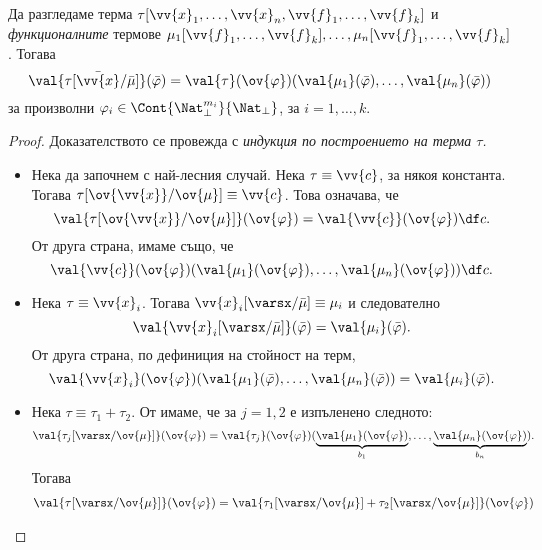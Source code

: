 \begin{framed}
  \begin{lemma}
    \label{lem:rec:substitution}
    Да разгледаме терма $\tau[\vv{x}_1,\dots,\vv{x}_n,\vv{f}_1,\dots,\vv{f}_{k}]$ и {\em функционалните} термове 
    $\mu_1[\vv{f}_1,\dots,\vv{f}_k],\dots, \mu_n[\vv{f}_1,\dots,\vv{f}_k]$.
    Тогава
    \[\val{\tau[\bar{\vv{x}}/\bar{\mu}]}(\bar{\varphi}) = \val{\tau}(\ov{\varphi})(\val{\mu_1}(\bar{\varphi}),\dots,\val{\mu_n}(\bar{\varphi}))\]
    за произволни $\varphi_i \in \Cont{\Nat^{m_i}_\bot}{\Nat_\bot}$, за $i = 1, \dots, k$.
  \end{lemma}
\end{framed}
\begin{proof}
  Доказателството се провежда с {\em индукция по построението на терма $\tau$.}
  \begin{itemize}
  \item
    Нека да започнем с най-лесния случай.
    Нека $\tau \equiv \vv{c}$, за някоя константа.
    Тогава $\tau[\ov{\vv{x}}/\ov{\mu}] \equiv \vv{c}$.
    Това означава, че 
    \[\val{\tau[\ov{\vv{x}}/\ov{\mu}]}(\ov{\varphi}) = \val{\vv{c}}(\ov{\varphi}) \df c.\]
    От друга страна, имаме също, че 
    \[\val{\vv{c}}(\ov{\varphi})(\val{\mu_1}(\ov{\varphi}),\dots,\val{\mu_n}(\ov{\varphi})) \df c.\]
  \item
    Нека $\tau \equiv \vv{x}_i$. Тогава $\vv{x}_i[\varsx/\bar{\mu}] \equiv \mu_i$
    и следователно 
    \[\val{\vv{x}_i[\varsx/\bar{\mu}]}(\bar{\varphi}) = \val{\mu_i}(\bar{\varphi}).\]
    От друга страна, по дефиниция на стойност на терм, 
    \[\val{\vv{x}_i}(\ov{\varphi})(\val{\mu_1}(\bar{\varphi}),\dots,\val{\mu_n}(\bar{\varphi})) = \val{\mu_i}(\bar{\varphi}).\]
  \item
    Нека $\tau \equiv \tau_1 + \tau_2$.
    От \IndHyp имаме, че за $j = 1,2$ е изпъленено следното:
    \[\val{\tau_j[\varsx/\ov{\mu}]}(\ov{\varphi}) = \val{\tau_j}(\ov{\varphi})(\underbrace{\val{\mu_1}(\ov{\varphi})}_{b_1},\dots,\underbrace{\val{\mu_n}(\ov{\varphi})}_{b_n}).\]
    Тогава
    \begin{align*}
      \val{\tau[\varsx/\ov{\mu}]}(\ov{\varphi}) & = \val{\tau_1[\varsx/\ov{\mu}] + \tau_2[\varsx/\ov{\mu}]}(\ov{\varphi})\\

\end{align*}
\end{itemize}
\end{proof}

